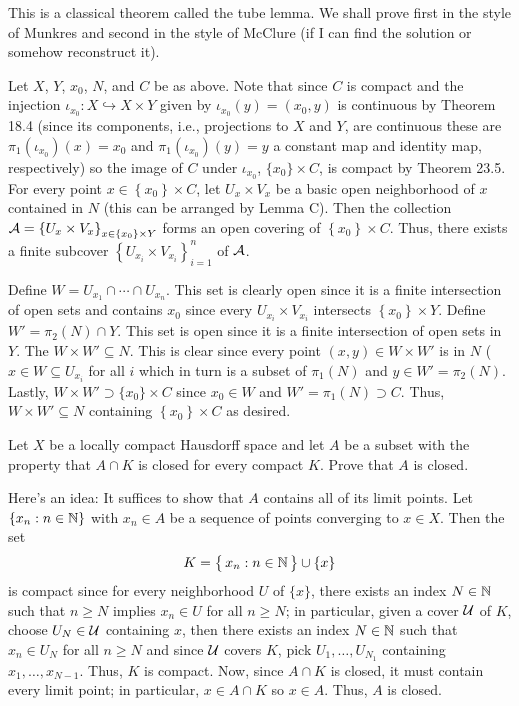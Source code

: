 \begin{solution}
  This is a classical theorem called the tube lemma. We shall prove first
  in the style of Munkres and second in the style of McClure (if I can find
  the solution or somehow reconstruct it).

  Let \(X\), \(Y\), \(x_0\), \(N\), and \(C\) be as above. Note that since
  \(C\) is compact and the injection
  \(\iota_{x_0}\colon X\hookrightarrow X\times Y\) given by
  \(\iota_{x_0}(y)=(x_0,y)\) is continuous by Theorem 18.4 (since its
  components, i.e., projections to \(X\) and \(Y\), are continuous these
  are \(\pi_1(\iota_{x_0})(x)=x_0\) and \(\pi_1(\iota_{x_0})(y)=y\) a
  constant map and identity map, respectively) so the image of \(C\) under
  \(\iota_{x_0}\), \(\{x_0\}\times C\), is compact by Theorem 23.5. For
  every point \(x\in\left\{x_0\right\}\times C\), let \(U_x\times V_x\) be
  a basic open neighborhood of \(x\) contained in \(N\) (this can be
  arranged by Lemma C). Then the collection
  \(\mathcal{A}=\left\{U_x\times V_x\right\}_{x\in\left\{x_0\right\}\times Y}\)
  forms an open covering of \(\left\{x_0\right\}\times C\). Thus, there
  exists a finite subcover \(\left\{U_{x_i}\times V_{x_i}\right\}_{i=1}^n\)
  of \(\mathcal{A}\).

  Define \(W= U_{x_1}\cap\dotsb\cap U_{x_n}\). This set is clearly open
  since it is a finite intersection of open sets and contains \(x_0\) since
  every \(U_{x_i}\times V_{x_i}\) intersects
  \(\left\{x_0\right\}\times Y\). Define \(W'=\pi_2(N)\cap Y\). This set is
  open since it is a finite intersection of open sets in \(Y\). The
  \(W\times W'\subseteq N\). This is clear since every point
  \((x,y)\in W\times W'\) is in \(N\) (\(x\in W\subseteq U_{x_i}\) for all
  \(i\) which in turn is a subset of \(\pi_1(N)\) and \(y\in
  W'=\pi_2(N)\). Lastly, \(W\times W'\supset \{x_0\}\times C\) since
  \(x_0\in W\) and \(W'=\pi_1(N)\supset C\). Thus,
  \(W\times W'\subseteq N\) containing \(\left\{x_0\right\}\times C\) as
  desired.
\end{solution}
\begin{problem}
  Let \(X\) be a locally compact Hausdorff space and let \(A\) be a subset
  with the property that \(A\cap K\) is closed for every compact
  \(K\). Prove that \(A\) is closed.
\end{problem}
\begin{solution}
  Here's an idea: It suffices to show that \(A\) contains all of its limit
  points. Let \(\{x_n:n\in\mathbb{N}\}\) with \(x_n\in A\) be a sequence of
  points converging to \(x\in X\). Then the set
  \[
    K=\bigl\{\,x_n:n\in\mathbb{N}\,\bigr\}\cup\{x\}
  \]
  is compact since for every neighborhood \(U\) of \(\{x\}\), there exists
  an index \(N\in\mathbb{N}\) such that \(n\geq N\) implies \(x_n\in U\) for all
  \(n\geq N\); in particular, given a cover \(\mathcal{U}\) of \(K\), choose
  \(U_N\in\mathcal{U}\) containing \(x\), then there exists an index \(N\in\mathbb{N}\)
  such that \(x_n\in U_N\) for all \(n\geq N\) and since \(\mathcal{U}\) covers
  \(K\), pick \(U_1,\dotsc,U_{N_1}\) containing
  \(x_1,\dotsc,x_{N-1}\). Thus, \(K\) is compact. Now, since \(A\cap K\) is
  closed, it must contain every limit point; in particular, \(x\in A\cap
  K\) so \(x\in A\). Thus, \(A\) is closed.
\end{solution}
